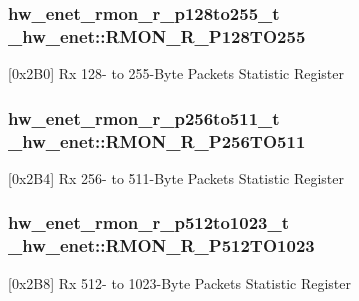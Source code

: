 \subsubsection[{\texorpdfstring{R\+M\+O\+N\+\_\+\+R\+\_\+\+P128\+T\+O255}{RMON_R_P128TO255}}]{ {\bf hw\+\_\+enet\+\_\+rmon\+\_\+r\+\_\+p128to255\+\_\+t} \+\_\+hw\+\_\+enet\+::\+R\+M\+O\+N\+\_\+\+R\+\_\+\+P128\+T\+O255}\hypertarget{struct__hw__enet_a6483b9379bb121d7983a9dccc4b28b09}{}\label{struct__hw__enet_a6483b9379bb121d7983a9dccc4b28b09}
\mbox{[}0x2\+B0\mbox{]} Rx 128-\/ to 255-\/\+Byte Packets Statistic Register 
\subsubsection[{\texorpdfstring{R\+M\+O\+N\+\_\+\+R\+\_\+\+P256\+T\+O511}{RMON_R_P256TO511}}]{ {\bf hw\+\_\+enet\+\_\+rmon\+\_\+r\+\_\+p256to511\+\_\+t} \+\_\+hw\+\_\+enet\+::\+R\+M\+O\+N\+\_\+\+R\+\_\+\+P256\+T\+O511}\hypertarget{struct__hw__enet_a59cbd125e4ae1e21596d57235498deb6}{}\label{struct__hw__enet_a59cbd125e4ae1e21596d57235498deb6}
\mbox{[}0x2\+B4\mbox{]} Rx 256-\/ to 511-\/\+Byte Packets Statistic Register 
\subsubsection[{\texorpdfstring{R\+M\+O\+N\+\_\+\+R\+\_\+\+P512\+T\+O1023}{RMON_R_P512TO1023}}]{ {\bf hw\+\_\+enet\+\_\+rmon\+\_\+r\+\_\+p512to1023\+\_\+t} \+\_\+hw\+\_\+enet\+::\+R\+M\+O\+N\+\_\+\+R\+\_\+\+P512\+T\+O1023}\hypertarget{struct__hw__enet_a1ba910cc1cd2a50e38d145b7e7ed7e0d}{}\label{struct__hw__enet_a1ba910cc1cd2a50e38d145b7e7ed7e0d}
\mbox{[}0x2\+B8\mbox{]} Rx 512-\/ to 1023-\/\+Byte Packets Statistic Register 
